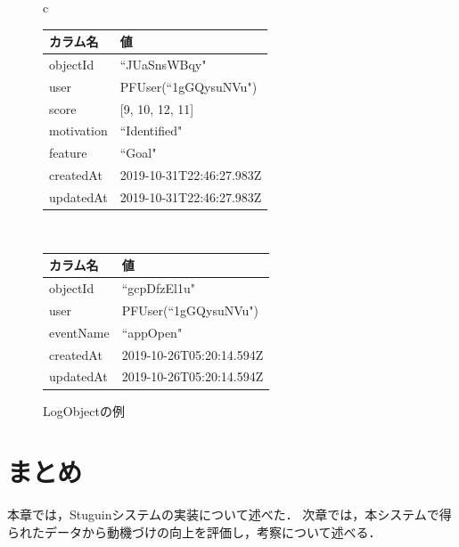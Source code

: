\begin{figure}[htb]
\begin{center}
\begin{tabular}{c}
\begin{minipage}[htb]{0.5\linewidth}
\begin{center}
  \begin{tabular}{|l|l|} \hline
    カラム名 & 値 \\ \hline
    objectId & ``JUaSnsWBqy" \\
    user & PFUser(``1gGQysuNVu") \\
    score & [9, 10, 12, 11] \\
    motivation & ``Identified" \\
    feature & ``Goal" \\
	createdAt & 2019-10-31T22:46:27.983Z \\
	updatedAt & 2019-10-31T22:46:27.983Z \\ \hline
  \end{tabular}
  \caption{QuestionnaireObjectの例}
  \label{tb:questionnaire_object}
\end{center}
\end{minipage}

\\

\begin{minipage}[htb]{\linewidth}
\begin{center}
  \begin{tabular}{|l|l|} \hline
    カラム名 & 値 \\ \hline
    objectId & ``gcpDfzEl1u" \\
    user & PFUser(``1gGQysuNVu") \\
    eventName & ``appOpen" \\
	createdAt & 2019-10-26T05:20:14.594Z \\
	updatedAt & 2019-10-26T05:20:14.594Z \\ \hline
  \end{tabular}
  \caption{LogObjectの例}
  \label{tb:log_object}
\end{center}
\end{minipage}

\end{tabular}
\end{center}
\end{figure}


\section{まとめ}
本章では，Stuguinシステムの実装について述べた．
次章では，本システムで得られたデータから動機づけの向上を評価し，考察について述べる．
